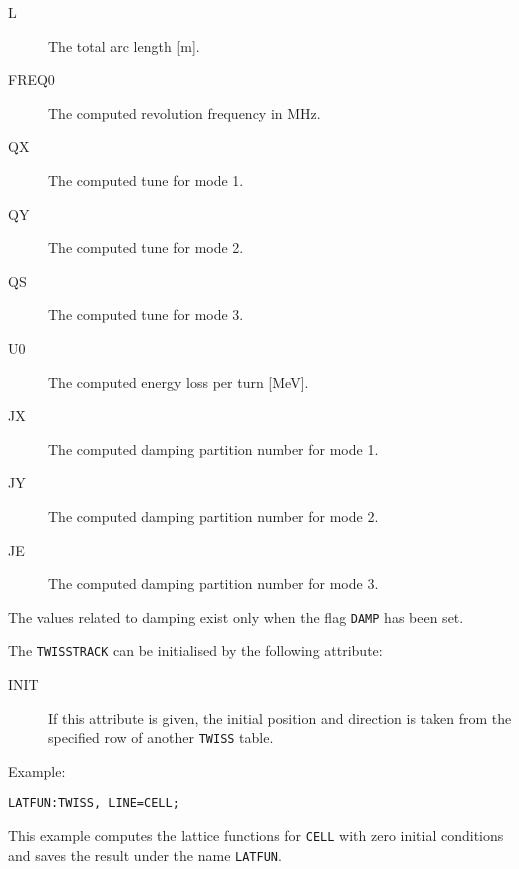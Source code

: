 \begin{description}
\item[L]
  The total arc length [m].
\item[FREQ0]
  The computed revolution frequency in MHz.
\item[QX]
  The computed tune for mode 1.
\item[QY]
  The computed tune for mode 2.
\item[QS]
  The computed tune for mode 3.
\item[U0]
  The computed energy loss per turn [MeV].
\item[JX]
  The computed damping partition number for mode 1.
\item[JY]
  The computed damping partition number for mode 2.
\item[JE]
  The computed damping partition number for mode 3.
\end{description}
The values related to damping exist only when the flag \texttt{DAMP}
has been set.

The \texttt{TWISSTRACK} can be initialised by the following attribute:
\begin{description}
\item[INIT]
  If this attribute is given, the initial position and direction is taken
  from the specified row of another \texttt{TWISS} table.
\end{description}

Example:
\begin{verbatim}
LATFUN:TWISS, LINE=CELL;
\end{verbatim}
This example computes the lattice functions for \texttt{CELL} with
zero initial conditions and saves the result under the name
\texttt{LATFUN}. 

